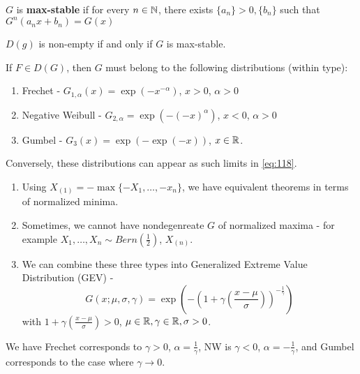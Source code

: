 \begin{defn}
  \label{defn:extreme_value_theory:1}
  $G$ is \textbf{max-stable} if for every $n \in \mathbb{N}$, there exists
  $\{ a_{n} \} > 0, \{ b_{n} \} $ such that $G^{n}(a_{n}x + b_{n}) = G(x)$
\end{defn}

\begin{thm}
  \label{defn:extreme_value_theory:2}
  $D(g)$ is non-empty if and only if $G$ is max-stable.
\end{thm}


\begin{thm}
  \label{defn:extreme_value_theory:3}
  If $F \in D(G)$, then $G$ must belong to the following distributions
  (within type):

  \begin{enumerate}
  \item Frechet - $G_{1, \alpha}(x) = \exp(-x^{-\alpha})$, $x > 0$,
    $\alpha > 0$
  \item Negative Weibull - $G_{2, \alpha} = \exp(- (-x)^{\alpha})$, $x
    < 0$, $\alpha > 0$
  \item Gumbel - $G_{3}(x) = \exp(-\exp(-x))$, $x \in \mathbb{R}$.
  \end{enumerate}

  Conversely, these distributions can appear as such limits in \eqref{eq:118}.
\end{thm}

\begin{remark}
  \begin{enumerate}
  \item Using $X_{(1)} = -\max \{ -X_{1}, \dots, -x_{n} \} $, we have
    equivalent theorems in terms of normalized minima.
  \item Sometimes, we cannot have nondegenreate $G$ of normalized
    maxima  - for example $X_{1}, \dots, X_{n} \sim
    Bern(\frac{1}{2})$, $X_{(n)}$.
  \item We can combine these three types into Generalized Extreme
    Value Distribution (GEV) -
    \begin{equation}
      \label{eq:122}
      G(x; \mu, \sigma, \gamma) = \exp(- (1 + \gamma(\frac{x-\mu}{\sigma}))^{-\frac{1}{\gamma}})
    \end{equation} with $1 + \gamma(\frac{x - \mu}{\sigma}) > 0$, $\mu
    \in \mathbb{R}, \gamma \in \mathbb{R}, \sigma > 0$.
  \end{enumerate}

  We have Frechet corresponds to $\gamma > 0$, $\alpha =
  \frac{1}{\gamma} $, NW is $\gamma < 0$, $\alpha =
  -\frac{1}{\gamma}$, and Gumbel corresponds to the case where $\gamma
  \rightarrow 0$.
\end{remark}

